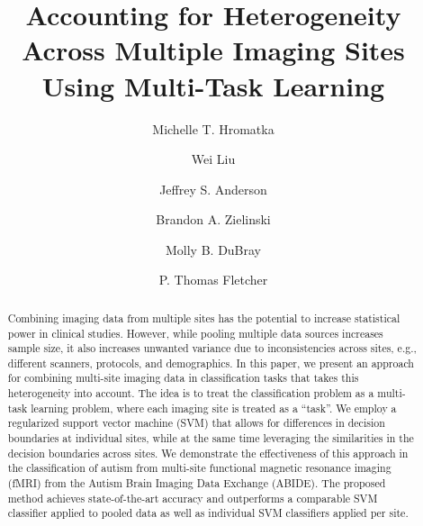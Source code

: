 \documentclass{llncs}
\begin{document}
\pagestyle{plain}

\mainmatter

\title{Accounting for Heterogeneity Across Multiple Imaging Sites Using Multi-Task
  Learning}
%
%
\author{Michelle T. Hromatka \and Wei Liu  \and Jeffrey S. Anderson \and Brandon A. Zielinski \and Molly B. DuBray \and P. Thomas Fletcher}


\maketitle

\begin{abstract}
Combining imaging data from multiple sites has the potential to increase
statistical power in clinical studies. However, while pooling multiple data
sources increases sample size, it also increases unwanted variance due to
inconsistencies across sites, e.g., different scanners, protocols, and
demographics. In this paper, we present an approach for combining multi-site
imaging data in classification tasks that takes this heterogeneity into
account. The idea is to treat the classification problem as a multi-task
learning problem, where each imaging site is treated as a ``task''. We employ a
regularized support vector machine (SVM) that allows for differences in decision
boundaries at individual sites, while at the same time leveraging the
similarities in the decision boundaries across sites. We demonstrate the
effectiveness of this approach in the classification of autism from multi-site
functional magnetic resonance imaging (fMRI) from the Autism Brain Imaging Data
Exchange (ABIDE). The proposed method achieves state-of-the-art accuracy and
outperforms a comparable SVM classifier applied to pooled data as well as
individual SVM classifiers applied per site.

\end{abstract}
\end{document}
